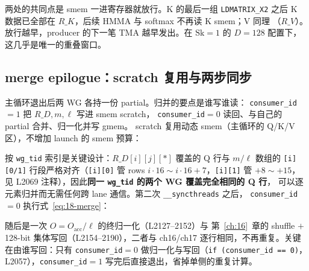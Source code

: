 



两处的共同点是 smem 一进寄存器就放行。K 的最后一组 \texttt{LDMATRIX\_X2}
之后 K 数据已全部在 $R\_K$，后续 HMMA 与 softmax 不再读 K smem；V 同理
（$R\_V$）。放行越早，producer 的下一笔 TMA 越早发出。在
$\mathrm{Sk}{=}1$ 的 $D{=}128$ 配置下，这几乎是唯一的重叠窗口。

\subsection{merge epilogue：scratch 复用与两步同步}

主循环退出后两 WG 各持一份 partial。归并的要点是谁写谁读：
\texttt{consumer\_id}$=1$ 把 $R\_D, m, \ell$ 写进 smem scratch，
\texttt{consumer\_id}$=0$ 读回、与自己的 partial 合并、归一化并写 gmem。
scratch 复用动态 smem（主循环的 Q/K/V 区），不增加 launch 的 smem
预算：





按 \texttt{wg\_tid} 索引是关键设计：$R\_D[i][j][*]$ 覆盖的 Q 行与 $m/\ell$
数组的 \texttt{[i][0/1]} 行段严格对齐（\texttt{[i][0]} 管 rows
$i\cdot16 \sim i\cdot16{+}7$，\texttt{[i][1]} 管 $+8 \sim +15$，见 L2069
注释），因此\textbf{同一 \texttt{wg\_tid} 的两个 WG 覆盖完全相同的 Q 行}，
可以逐元素归并而无需任何跨 lane 通信。第二次 \texttt{\_\allowbreak{}\_\allowbreak{}syncthreads} 之后，
\texttt{consumer\_id}$=0$ 执行式~\ref{eq:18-merge}：



随后是一次 $O = O_{\mathrm{acc}}/\ell$ 的终归一化（L2127--2152）与
第~\ref{ch:16}~章的 shuffle $+$ 128-bit 集体写回（L2154--2190），二者与
ch16/ch17 逐行相同，不再重复。关键在由谁写回：只有
\texttt{consumer\_id}$=0$ 做归一化与写回（\texttt{if \allowbreak{}(consumer\_\allowbreak{}id =\allowbreak{}=\allowbreak{} 0)}，
L2057），\texttt{consumer\_id}$=1$ 写完后直接退出，省掉单侧的重复计算。


